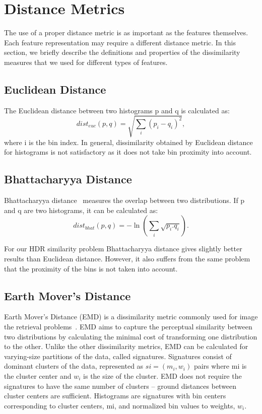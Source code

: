 \section{Distance Metrics}
The use of a proper distance metric is as important as the features themselves. Each feature representation
may require a different distance metric. In this section, we briefly describe the definitions and properties of the dissimilarity measures that we used for different types of features.
\subsection{Euclidean Distance}
The Euclidean distance between two histograms p and q is calculated as:
\begin{equation}
dist_{euc}(p,q) = \sqrt{\sum_i(p_i-q_i)^2},
\end{equation}
where i is the bin index. In general, dissimilarity obtained by Euclidean distance for histograms is not satisfactory as it does not take bin proximity into account.
\subsection{Bhattacharyya Distance}
Bhattacharyya distance~\cite{bhattacharyya1946measure} measures the overlap between two distributions. If p and q are two histograms, it can be calculated as:
\begin{equation}
dist_{bhat}(p,q) = -\ln \left( \sum_i \sqrt{p_i.q_i} \right).
\end{equation}

For our HDR similarity problem Bhattacharyya distance gives slightly better results than Euclidean distance. However, it also suffers from the same problem that the proximity of the bins is not taken into account.
\subsection{Earth Mover’s Distance}
Earth Mover’s Distance (EMD) is a dissimilarity metric commonly used for image the retrieval problems~\cite{rubner2000earth}. EMD aims to capture the perceptual similarity between two distributions by calculating the minimal cost of transforming one distribution to the other. Unlike the other dissimilarity metrics, EMD can be calculated for varying-size partitions of the data, called signatures.
Signatures consist of dominant clusters of the data, represented as $si = (m_i, w_i)$ pairs where mi is the cluster center and $w_i$ is the size of the cluster. EMD does not require the signatures to have the same number of clusters – ground distances between cluster centers are sufficient. Histograms are signatures with bin centers corresponding to cluster centers, mi, and normalized bin values to weights, $w_i$.

